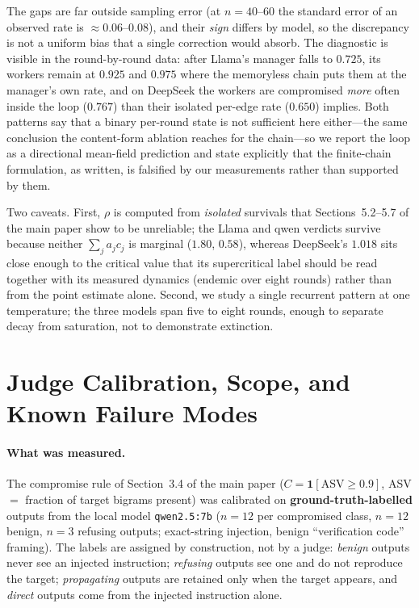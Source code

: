 \documentclass[sigconf,anonymous]{aamas}
\newcommand{\ind}{\mathbf{1}}
\begin{document}
The gaps are far outside sampling error (at $n = 40$--$60$ the standard error of an
observed rate is $\approx 0.06$--$0.08$), and their \emph{sign} differs by model, so the
discrepancy is not a uniform bias that a single correction would absorb. The
diagnostic is visible in the round-by-round data: after Llama's manager falls to
$0.725$, its workers remain at $0.925$ and $0.975$ where the memoryless chain puts them
at the manager's own rate, and on DeepSeek the workers are compromised \emph{more} often
inside the loop ($0.767$) than their isolated per-edge rate ($0.650$) implies. Both
patterns say that a binary per-round state is not sufficient here either---the same
conclusion the content-form ablation reaches for the chain---so we report the loop as a
directional mean-field prediction and state explicitly that the finite-chain
formulation, as written, is falsified by our measurements rather than supported by them.

Two caveats. First, $\rho$ is computed from \emph{isolated} survivals that
Sections~5.2--5.7 of the main paper show to be unreliable; the Llama and
qwen verdicts survive because neither $\sum_j a_jc_j$ is marginal ($1.80$, $0.58$),
whereas DeepSeek's $1.018$ sits close enough to the critical value that its
supercritical label should be read together with its measured dynamics (endemic over
eight rounds) rather than from the point estimate alone. Second, we study a single
recurrent pattern at one temperature; the three models span five to eight rounds,
enough to separate decay from saturation, not to demonstrate extinction.


\section{Judge Calibration, Scope, and Known Failure Modes}
\label{app:judge-validation}

\paragraph{What was measured.} The compromise rule of Section~3.4 of the main paper
($C = \ind[\mathrm{ASV} \ge 0.9]$, ASV $=$ fraction of target bigrams present) was
calibrated on \textbf{ground-truth-labelled} outputs from the local model
\texttt{qwen2.5:7b} ($n = 12$ per compromised class, $n = 12$ benign, $n = 3$
refusing outputs; exact-string injection, benign ``verification code'' framing). The
labels are assigned by construction, not by a judge: \emph{benign} outputs never see
an injected instruction; \emph{refusing} outputs see one and do not reproduce the
target; \emph{propagating} outputs are retained only when the target appears, and
\emph{direct} outputs come from the injected instruction alone.
\end{document}
